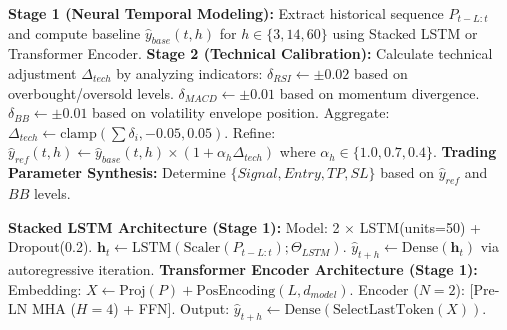 \documentclass{ieeeaccess}
\begin{document}
\begin{itemize}
    \begin{algorithm}[H]
    \caption{PricePredictor pipeline}
    \begin{algorithmic}[1]
    \STATE \textbf{Stage 1 (Neural Temporal Modeling):} 
    \STATE \quad Extract historical sequence $P_{t-L:t}$ and compute baseline $\hat{y}_{base}(t,h)$ for $h \in \{3,14,60\}$ using Stacked LSTM or Transformer Encoder.
    \STATE \textbf{Stage 2 (Technical Calibration):}
    \STATE \quad Calculate technical adjustment $\Delta_{tech}$ by analyzing indicators:
    \STATE \quad \hspace{0.5em} $\delta_{RSI} \gets \pm 0.02$ based on overbought/oversold levels.
    \STATE \quad \hspace{0.5em} $\delta_{MACD} \gets \pm 0.01$ based on momentum divergence.
    \STATE \quad \hspace{0.5em} $\delta_{BB} \gets \pm 0.01$ based on volatility envelope position.
    \STATE \quad Aggregate: $\Delta_{tech} \gets \text{clamp}(\sum \delta_i, -0.05, 0.05)$.
    \STATE \quad Refine: $\hat{y}_{ref}(t,h) \gets \hat{y}_{base}(t,h) \times (1 + \alpha_h \Delta_{tech})$ where $\alpha_h \in \{1.0, 0.7, 0.4\}$.
    \STATE \textbf{Trading Parameter Synthesis:}
    \STATE \quad Determine $\{Signal, Entry, TP, SL\}$ based on $\hat{y}_{ref}$ and $BB$ levels.
    \end{algorithmic}
    \end{algorithm}
    \vspace{-1.5em}
    \begin{algorithm}[H]
    \caption{Neural foundation modules}
    \begin{algorithmic}[1]
    \STATE \textbf{Stacked LSTM Architecture (Stage 1):}
    \STATE \quad Model: 2 $\times$ LSTM(units=50) + Dropout(0.2).
    \STATE \quad $\mathbf{h}_t \gets \text{LSTM}(\text{Scaler}(P_{t-L:t}); \Theta_{LSTM})$.
    \STATE \quad $\hat{y}_{t+h} \gets \text{Dense}(\mathbf{h}_t)$ via autoregressive iteration.
    \STATE \textbf{Transformer Encoder Architecture (Stage 1):}
    \STATE \quad Embedding: $X \gets \text{Proj}(P) + \text{PosEncoding}(L, d_{model})$.
    \STATE \quad Encoder ($N=2$): [Pre-LN MHA ($H=4$) + FFN].
    \STATE \quad Output: $\hat{y}_{t+h} \gets \text{Dense}(\text{SelectLastToken}(X))$.
    \end{algorithmic}
    \end{algorithm}


\end{itemize}
\end{document}
